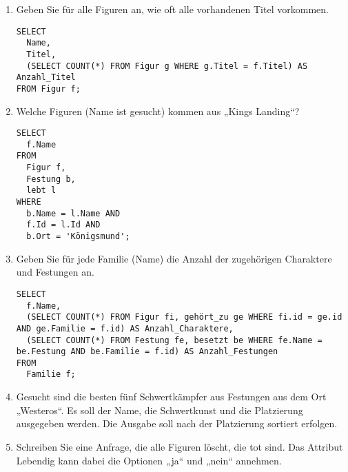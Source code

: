 \documentclass{lehramt-informatik-aufgabe}
\begin{document}
\begin{enumerate}

%

\item Geben Sie für alle Figuren an, wie oft alle vorhandenen Titel
vorkommen.

\begin{antwort}
\begin{verbatim}
SELECT
  Name,
  Titel,
  (SELECT COUNT(*) FROM Figur g WHERE g.Titel = f.Titel) AS Anzahl_Titel
FROM Figur f;
\end{verbatim}
\end{antwort}

%

\item Welche Figuren (Name ist gesucht) kommen aus „Kings Landing“?

\begin{antwort}
\begin{verbatim}
SELECT
  f.Name
FROM
  Figur f,
  Festung b,
  lebt l
WHERE
  b.Name = l.Name AND
  f.Id = l.Id AND
  b.Ort = 'Königsmund';
\end{verbatim}
\end{antwort}

%

\item Geben Sie für jede Familie (Name) die Anzahl der zugehörigen
Charaktere und Festungen an.

\begin{antwort}
\begin{verbatim}
SELECT
  f.Name,
  (SELECT COUNT(*) FROM Figur fi, gehört_zu ge WHERE fi.id = ge.id AND ge.Familie = f.id) AS Anzahl_Charaktere,
  (SELECT COUNT(*) FROM Festung fe, besetzt be WHERE fe.Name = be.Festung AND be.Familie = f.id) AS Anzahl_Festungen
FROM
  Familie f;
\end{verbatim}
\end{antwort}

%

\item Gesucht sind die besten fünf Schwertkämpfer aus Festungen aus dem
Ort „Westeros“. Es soll der Name, die Schwertkunst und die Platzierung
ausgegeben werden. Die Ausgabe soll nach der Platzierung sortiert
erfolgen.

%

\item Schreiben Sie eine Anfrage, die alle Figuren löscht, die tot sind.
Das Attribut Lebendig kann dabei die Optionen „ja“ und „nein“ annehmen.


\end{enumerate}
\end{document}
